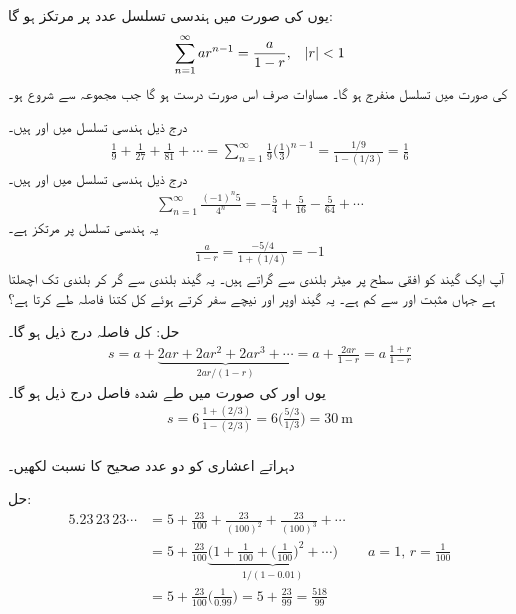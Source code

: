 یوں  کی صورت میں ہندسی تسلسل  عدد  پر مرتکز ہو گا:
\begin{align}\label{مساوات_تسلسل_مجموعہ_ہندسی_تسلسل}
\sum_{n=1}^{\infty}ar^{n-1}=\frac{a}{1-r},\quad \abs{r}<1
\end{align}
 کی صورت میں تسلسل منفرج ہو گا۔ مساوات  صرف اس صورت درست ہو گا جب مجموعہ  سے شروع ہو۔

درج ذیل ہندسی تسلسل میں  اور  ہیں۔
\begin{align*}
\frac{1}{9}+\frac{1}{27}+\frac{1}{81}+\cdots=\sum_{n=1}^{\infty}\frac{1}{9}\big(\frac{1}{3}\big)^{n-1}=\frac{1/9}{1-(1/3)}=\frac{1}{6}
\end{align*}
درج ذیل ہندسی تسلسل میں  اور  ہیں۔
\begin{align*}
\sum_{n=1}^{\infty}\frac{(-1)^n5}{4^n}=-\frac{5}{4}+\frac{5}{16}-\frac{5}{64}+\cdots
\end{align*}
یہ ہندسی تسلسل  پر مرتکز ہے۔
\begin{align*}
\frac{a}{1-r}=\frac{-5/4}{1+(1/4)}=-1
\end{align*}
آپ ایک گیند کو افقی سطح پر  میٹر بلندی سے گراتے ہیں۔ یہ گیند  بلندی سے گر کر  بلندی تک اچھلتا  ہے جہاں  مثبت اور  سے کم ہے۔ یہ گیند اوپر اور نیچے سفر کرتے ہوئے کل کتنا فاصلہ طے کرتا ہے؟

حل:\quad
کل فاصلہ درج ذیل ہو گا۔
\begin{align*}
s=a+\underbrace{2ar+2ar^2+2ar^3+\cdots}_{2ar/(1-r)}=a+\frac{2ar}{1-r}=a\,\frac{1+r}{1-r}
\end{align*}
یوں  اور  کی صورت میں طے شدہ فاصل درج ذیل ہو گا۔
\begin{align*}
s=6\,\frac{1+(2/3)}{1-(2/3)}=6\big(\frac{5/3}{1/3}\big)=\SI{30}{\meter}
\end{align*} 
\\
دہراتے اعشاری  کو دو عدد صحیح کا نسبت لکھیں۔

حل:\quad
\begin{align*}
5.23\,23\,23\cdots&=5+\frac{23}{100}+\frac{23}{(100)^2}+\frac{23}{(100)^3}+\cdots\\
&=5+\frac{23}{100}\underbrace{\big(1+\frac{1}{100}+\big(\frac{1}{100}\big)^2+\cdots\big)}_{1/(1-0.01)}&&a=1,\, r=\tfrac{1}{100}\\
&=5+\frac{23}{100}\big(\frac{1}{0.99}\big)=5+\frac{23}{99}=\frac{518}{99}
\end{align*}

